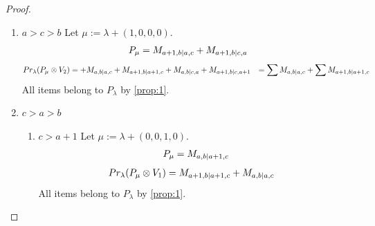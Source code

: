 \begin{proof}
\begin{enumerate}
\begin{enumerate}
\item $b=a+1$
        Let $\mu:=\lambda + (1,0,0,0) $. 
\begin{equation}\notag
  \begin{aligned}
      P_{\mu} =
M_{a+1,a+1|a,c}
+M_{a+1,a+1|c,a}
  \end{aligned}
\end{equation}
\begin{equation}\notag
  \begin{aligned}
  Pr_{\lambda}(P_\mu \otimes V_2) &=
M_{a,a+1|a,c}
+M_{a+1,a|a,c}
+M_{a+1,a+1|a+1,c}
+M_{a,a+1|c,a}
+M_{a+1,a|c,a}
+M_{a+1,a+1|c,a+1}\\
                                  &=
\sum M_{a,a+1|a,c}
+\sum M_{a+1,a+1|a+1,c}
  \end{aligned}
\end{equation}
All items belong to $P_\lambda$ by \cref{prop:1}.
  \end{enumerate}
  
\item $a>c>b$
        Let $\mu:=\lambda + (1,0,0,0) $. 
\begin{equation}\notag
  \begin{aligned}
      P_{\mu} =
M_{a+1,b|a,c}
+M_{a+1,b|c,a}
  \end{aligned}
\end{equation}
\begin{equation}\notag
  \begin{aligned}
  Pr_{\lambda}(P_\mu \otimes V_2) &=
+M_{a,b|a,c}
+M_{a+1,b|a+1,c}
+M_{a,b|c,a}
+M_{a+1,b|c,a+1}
                                  &=
\sum M_{a,b|a,c}
+\sum M_{a+1,b|a+1,c}
  \end{aligned}
\end{equation}
All items belong to $P_\lambda$ by \cref{prop:1}.

\item $c>a>b$
  \begin{enumerate}
    \item $c>a+1$
        Let $\mu:=\lambda + (0,0,1,0) $. 
\begin{equation}\notag
  \begin{aligned}
      P_{\mu} =M_{a,b|a+1,c}
  \end{aligned}
\end{equation}
\begin{equation}\notag
  \begin{aligned}
  Pr_{\lambda}(P_\mu \otimes V_1) &=
M_{a+1,b|a+1,c}
+M_{a,b|a,c}
  \end{aligned}
\end{equation}
All items belong to $P_\lambda$ by \cref{prop:1}.
    

\end{enumerate}
\end{enumerate}
\end{proof}
